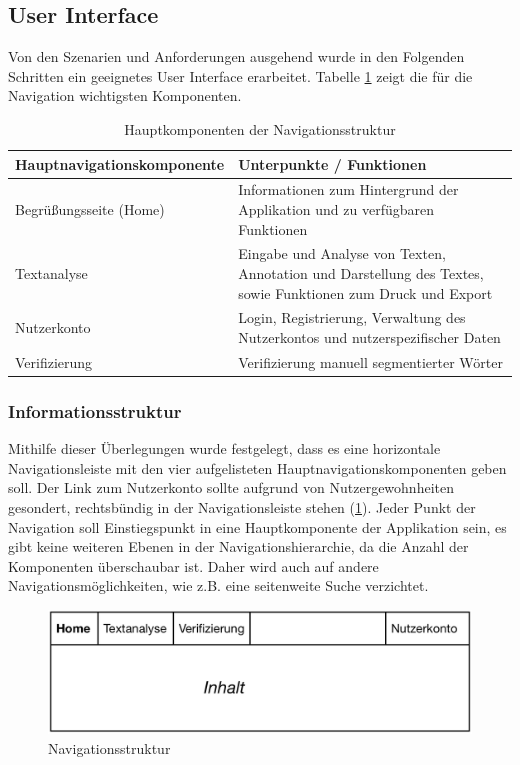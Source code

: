 \subsection{User Interface}
Von den Szenarien und Anforderungen ausgehend wurde in den Folgenden Schritten ein geeignetes User Interface erarbeitet. Tabelle \ref{table:navigation} zeigt die für die Navigation wichtigsten Komponenten.

\begin{table}[h!]
	\centering
	\begin{tabular}{|l|p{8cm}|}
		\hline
		Hauptnavigationskomponente & Unterpunkte / Funktionen \\
		\hline
		\hline
		Begrüßungsseite (Home) & Informationen zum Hintergrund der Applikation und zu verfügbaren Funktionen\\
		\hline
		Textanalyse & Eingabe und Analyse von Texten, Annotation und Darstellung des Textes, sowie Funktionen zum Druck und Export\\
		\hline
		Nutzerkonto & Login, Registrierung, Verwaltung des Nutzerkontos und nutzerspezifischer Daten \\
		\hline
		Verifizierung & Verifizierung manuell segmentierter Wörter \\
		\hline
	\end{tabular}
	\caption{Hauptkomponenten der Navigationsstruktur}
	\label{table:navigation}
\end{table}

\subsubsection{Informationsstruktur}

Mithilfe dieser Überlegungen wurde festgelegt, dass es eine horizontale Navigationsleiste mit den vier aufgelisteten Hauptnavigationskomponenten geben soll. Der Link zum Nutzerkonto sollte aufgrund von Nutzergewohnheiten gesondert, rechtsbündig in der Navigationsleiste stehen (\ref{fig:navigation}). Jeder Punkt der Navigation soll Einstiegspunkt in eine Hauptkomponente der Applikation sein, es gibt keine weiteren Ebenen in der Navigationshierarchie, da die Anzahl der Komponenten überschaubar ist. Daher wird auch auf andere Navigationsmöglichkeiten, wie z.B. eine seitenweite Suche verzichtet.


\begin{figure}[h!]
	\centering
	\includegraphics[width=.8\linewidth]{figures/navigation}
	\caption{Navigationsstruktur}
	\label{fig:navigation}
\end{figure}

